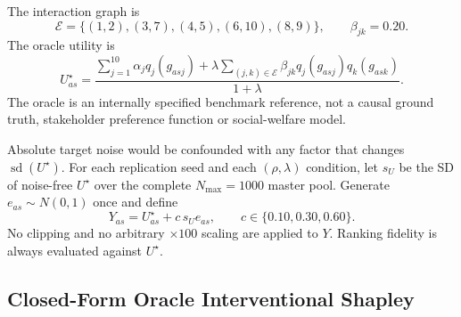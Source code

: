 \documentclass[runningheads]{llncs}
\begin{document}
The interaction graph is
\begin{equation}
\mathcal E=\{(1,2),(3,7),(4,5),(6,10),(8,9)\},
\qquad \beta_{jk}=0.20.
\label{eq:interactions}
\end{equation}
The oracle utility is
\begin{equation}
U_{as}^{\star}
=
\frac{
\sum_{j=1}^{10}\alpha_j q_j(g_{asj})
+\lambda\sum_{(j,k)\in\mathcal E}\beta_{jk}q_j(g_{asj})q_k(g_{ask})
}{1+\lambda}.
\label{eq:oracle}
\end{equation}
The oracle is an internally specified benchmark reference, not a causal ground truth, stakeholder
preference function or social-welfare model.

Absolute target noise would be confounded with any factor that changes
$\operatorname{sd}(U^\star)$. For each replication seed and each $(\rho,\lambda)$ condition,
let $s_U$ be the SD of noise-free $U^\star$ over the complete $N_{\max}=1000$ master pool.
Generate $e_{as}\sim N(0,1)$ once and define
\begin{equation}
Y_{as}=U_{as}^{\star}+c\,s_Ue_{as},
\qquad c\in\{0.10,0.30,0.60\}.
\label{eq:target}
\end{equation}
No clipping and no arbitrary $\times100$ scaling are applied to $Y$. Ranking fidelity is always
evaluated against $U^\star$.

\subsection{Closed-Form Oracle Interventional Shapley}
\end{document}
